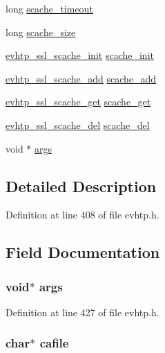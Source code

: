 \begin{DoxyCompactItemize}
\item 
long \hyperlink{structevhtp__ssl__cfg__s_a32dceaa2f20a1c9f617b4025845feff8}{scache\_\-timeout}
\item 
long \hyperlink{structevhtp__ssl__cfg__s_ae2e14ee7309cb5910c05d6a728fa276c}{scache\_\-size}
\item 
\hyperlink{evhtp_8h_acc2a1492a21e87e24e46b8105ce16af5}{evhtp\_\-ssl\_\-scache\_\-init} \hyperlink{structevhtp__ssl__cfg__s_a9a8bc5976342f1f9f6670df6aa2421d2}{scache\_\-init}
\item 
\hyperlink{evhtp_8h_a88e4d535033e8110eb232e2f9f8afbc6}{evhtp\_\-ssl\_\-scache\_\-add} \hyperlink{structevhtp__ssl__cfg__s_a3b1adda2604e2f06fcf871690d83316b}{scache\_\-add}
\item 
\hyperlink{evhtp_8h_aa0fab8ce3ec339ff62a366be3c3a6af9}{evhtp\_\-ssl\_\-scache\_\-get} \hyperlink{structevhtp__ssl__cfg__s_aaaec9de37c98a03578c9a6c20de897ad}{scache\_\-get}
\item 
\hyperlink{evhtp_8h_a0850d66a9f1a8f87da1771a8b5deb691}{evhtp\_\-ssl\_\-scache\_\-del} \hyperlink{structevhtp__ssl__cfg__s_a040f341668db7112bb0bec3fa2ee3828}{scache\_\-del}
\item 
void $\ast$ \hyperlink{structevhtp__ssl__cfg__s_add0eb34e0cef9e763462cf9080f9be0a}{args}
\end{DoxyCompactItemize}


\subsection{Detailed Description}


Definition at line 408 of file evhtp.h.



\subsection{Field Documentation}
\hypertarget{structevhtp__ssl__cfg__s_add0eb34e0cef9e763462cf9080f9be0a}{
\subsubsection[{args}]{\setlength{\rightskip}{0pt plus 5cm}void$\ast$ {\bf args}}}
\label{structevhtp__ssl__cfg__s_add0eb34e0cef9e763462cf9080f9be0a}


Definition at line 427 of file evhtp.h.

\hypertarget{structevhtp__ssl__cfg__s_a9ff8d56644bac1d41f8039f2fde5acf2}{
\subsubsection[{cafile}]{\setlength{\rightskip}{0pt plus 5cm}char$\ast$ {\bf cafile}}}
\label{structevhtp__ssl__cfg__s_a9ff8d56644bac1d41f8039f2fde5acf2}



